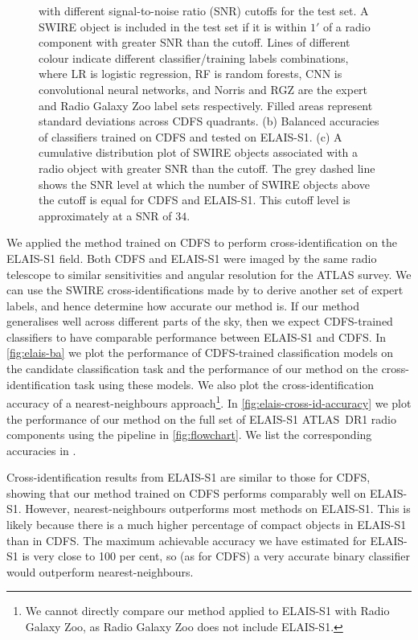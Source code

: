 \begin{figure}
{      with different signal-to-noise ratio (SNR) cutoffs for the test set. A
      SWIRE object is included in the test set if it is within $1'$ of a radio
      component with greater SNR than the cutoff. Lines of different colour
      indicate different classifier/training labels combinations, where LR is
      logistic regression, RF is random forests, CNN is convolutional neural
      networks, and Norris and RGZ are the expert and Radio Galaxy Zoo label
      sets respectively. Filled areas represent standard deviations across
      CDFS quadrants. (b) Balanced accuracies of classifiers trained on CDFS
      and tested on ELAIS-S1. (c) A cumulative distribution plot of SWIRE
      objects associated with a radio object with greater SNR than the cutoff.
      The grey dashed line shows the SNR level at which the number of SWIRE
      objects above the cutoff is equal for CDFS and ELAIS-S1. This cutoff level
      is approximately at a SNR of $34$.}
    \label{fig:accuracies-flux}
  \end{figure}

  We applied the method trained on CDFS to perform cross-identification on the
  ELAIS-S1 field. Both CDFS and ELAIS-S1 were imaged by the same radio
  telescope to similar sensitivities and angular resolution for the ATLAS
  survey. {We can use the SWIRE cross-identifications made by
  \citet{middelberg08} to derive another set of expert labels, and hence
  determine how accurate our method is. If our method generalises well across
  different parts of the sky, then we expect CDFS-trained classifiers to have
  comparable performance between ELAIS-S1 and CDFS}. In \autoref{fig:elais-ba}
  we plot the performance of CDFS-trained classification models on the candidate classification task and
  the performance of our method on the cross-identification task using these models. We also plot
  the cross-identification accuracy of a nearest-neighbours approach\footnote{{We cannot
  directly compare our method applied to ELAIS-S1 with Radio Galaxy Zoo, as
  Radio Galaxy Zoo does not include ELAIS-S1.}}. In
  \autoref{fig:elais-cross-id-accuracy} we plot the performance of our method
  on the full set of ELAIS-S1 ATLAS~DR1 radio components using the pipeline in
  \autoref{fig:flowchart}. We list the corresponding accuracies in
  .

  Cross-identification results from ELAIS-S1 are similar to those for CDFS,
  showing that our method trained on CDFS performs comparably well on
  ELAIS-S1. However, nearest-neighbours outperforms most methods on ELAIS-S1.
  This is likely because there is a much higher percentage of compact objects
  in ELAIS-S1 than in CDFS. The maximum achievable accuracy we have estimated
  for ELAIS-S1 is very close to 100 per cent, so (as for CDFS) a very accurate
  binary classifier would outperform nearest-neighbours.


